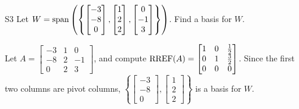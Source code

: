 \documentclass{sbgLAexam}
\begin{document}
\begin{extract}\newpage\end{extract}
\begin{problem}{S3}
Let $W = {\rm span} \left( \left\{  \begin{bmatrix} -3 \\ -8 \\ 0 \end{bmatrix}, \begin{bmatrix} 1 \\ 2 \\ 2 \end{bmatrix}, \begin{bmatrix} 0 \\ -1 \\ 3 \end{bmatrix} \right\} \right)$.   Find a basis for $W$.
\end{problem}
\begin{solution}
Let $A= \begin{bmatrix}-3 & 1 & 0 \\ -8 & 2 & -1 \\ 0 & 2 & 3\end{bmatrix}$, and compute $\operatorname{RREF}(A) = \begin{bmatrix} 1 & 0 & \frac{1}{2} \\ 0 & 1 & \frac{3}{2} \\ 0 & 0 & 0 \end{bmatrix}$.
Since the first two columns are pivot columns, $\left\{ \begin{bmatrix} -3 \\ -8 \\ 0 \end{bmatrix}, \begin{bmatrix} 1 \\ 2 \\ 2 \end{bmatrix} \right\} $ is a basis for $W$.
\end{solution}
\end{document}
